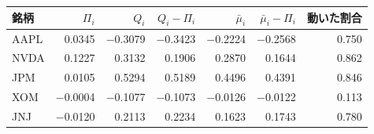 \begin{tabular}{lrrrrrr}
\toprule
銘柄 & $\Pi_i$ & $Q_i$ & $Q_i - \Pi_i$ & $\bar\mu_i$ & $\bar\mu_i - \Pi_i$ & 動いた割合 \\
\midrule
AAPL & 0.0345 & \ensuremath{-}0.3079 & \ensuremath{-}0.3423 & \ensuremath{-}0.2224 & \ensuremath{-}0.2568 & 0.750 \\
NVDA & 0.1227 & 0.3132 & 0.1906 & 0.2870 & 0.1644 & 0.862 \\
JPM & 0.0105 & 0.5294 & 0.5189 & 0.4496 & 0.4391 & 0.846 \\
XOM & \ensuremath{-}0.0004 & \ensuremath{-}0.1077 & \ensuremath{-}0.1073 & \ensuremath{-}0.0126 & \ensuremath{-}0.0122 & 0.113 \\
JNJ & \ensuremath{-}0.0120 & 0.2113 & 0.2234 & 0.1623 & 0.1743 & 0.780 \\
\bottomrule
\end{tabular}
